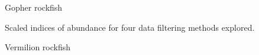 \documentclass[
  12pt,
  authoryear,
  preprint,
  3p]{elsarticle}
\begin{document}
\begin{figure}
\begin{minipage}[t]{0.50\linewidth}
{\centering 


\caption{\label{fig-gopher-indices}Gopher rockfish}

}

\end{minipage}%
%
\begin{minipage}[t]{0.50\linewidth}

{\centering 


\caption{\label{fig-vermilion-indices}Vermilion rockfish}

}

\end{minipage}%
\newline
\begin{minipage}[t]{0.50\linewidth}

{\centering 

Scaled indices of abundance for four data filtering methods explored.

}

\end{minipage}%

\end{figure}


  
\end{document}
